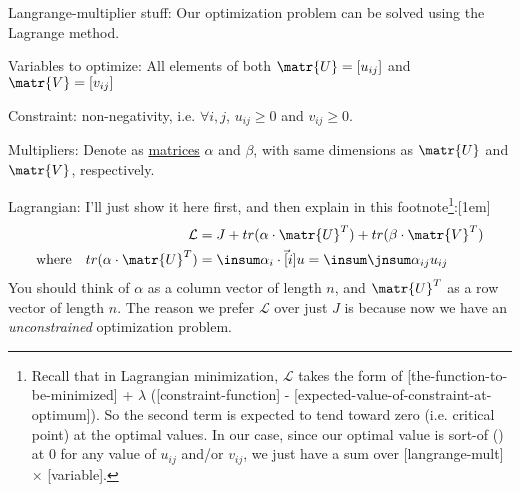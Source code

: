 \documentclass[11pt]{article}
\begin{document}
\p Langrange-multiplier stuff: Our optimization problem can be solved using the Lagrange method.
\begin{compactitem}
	\item Variables to optimize: All elements of both $\matr{U} = [u_{ij}]$ and $\matr{V} = [v_{ij}]$
	\item Constraint: non-negativity, i.e. $\forall i,j$, $u_{ij} \ge 0$ and $v_{ij} \ge 0$. 
	\item Multipliers: Denote as \underline{matrices} $\alpha$ and $\beta$, with same dimensions as $\matr{U}$ and $\matr{V}$, respectively. 
	\item Lagrangian: I'll just show it here first, and then explain in this footnote\footnote{
		 Recall that in Lagrangian minimization, $\mathcal{L}$ takes the form of [the-function-to-be-minimized] + $\lambda$ ([constraint-function] - [expected-value-of-constraint-at-optimum]). So the second term is expected to tend toward zero (i.e. critical point) at the optimal values. In our case, since our optimal value is sort-of () at 0 for any value of $u_{ij}$ and/or $v_{ij}$, we just have a sum over [langrange-mult] $\times$ [variable]. 
		}:
	\begin{align}
		\mathcal{L} &= J + tr(\alpha \cdot \matr{U}^T) + tr(\beta \cdot \matr{V}^T) \\
		\text{where} \quad tr(\alpha \cdot \matr{U}^T) 
			&= \insum \alpha_i \cdot \vec[i]{u}
			= \insum \jnsum \alpha_{ij} u_{ij}
	\end{align}
	You should think of $\alpha$ as a column vector of length $n$, and $\matr{U}^T$ as a row vector of length $n$. The reason we prefer $\mathcal{L}$ over just $J$ is because now we have an \textit{unconstrained} optimization problem.
	

\end{compactitem}
\end{document}
